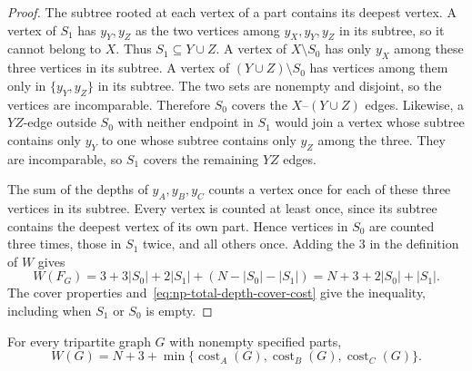 \begin{proof}
The subtree rooted at each vertex of a part contains its deepest vertex. A vertex
of $S_1$ has $y_Y,y_Z$ as the two vertices among $y_X,y_Y,y_Z$ in its subtree,
so it cannot belong to $X$. Thus $S_1\subseteq Y\cup Z$. A vertex
of $X\setminus S_0$ has only $y_X$ among these three vertices in its
subtree. A vertex of $(Y\cup Z)\setminus S_0$ has vertices
among them only in $\{y_Y,y_Z\}$ in its subtree. The two sets are
nonempty and disjoint, so the vertices are incomparable. Therefore
$S_0$ covers the
$X$--$(Y\cup Z)$ edges. Likewise, a $YZ$-edge outside $S_0$ with
neither endpoint in $S_1$ would join a vertex whose subtree contains only $y_Y$
to one whose subtree contains only $y_Z$ among the three. They are incomparable, so $S_1$
covers the remaining $YZ$ edges.

The sum of the depths of $y_A,y_B,y_C$ counts a vertex once for each
of these three vertices in its subtree. Every vertex is counted at least
once, since its subtree contains the deepest vertex of its own part.
Hence vertices in $S_0$ are counted three
times, those in $S_1$ twice, and all others once. Adding the $3$ in
the definition of $W$ gives
\[
 W(F_G)=3+3|S_0|+2|S_1|+(N-|S_0|-|S_1|)
       =N+3+2|S_0|+|S_1|.
\]
The cover properties and~\eqref{eq:np-total-depth-cover-cost} give
the inequality, including when $S_1$ or $S_0$ is empty.
\end{proof}

\begin{lemma}
\label{lem:np-total-depth-path-cost}
For every tripartite graph $G$ with nonempty specified parts,
\begin{equation}\label{eq:np-total-depth-path-cost-formula}
 W(G)=N+3+\min\{\operatorname{cost}_A(G),
                   \operatorname{cost}_B(G),
                   \operatorname{cost}_C(G)\}.
\end{equation}
\end{lemma}


